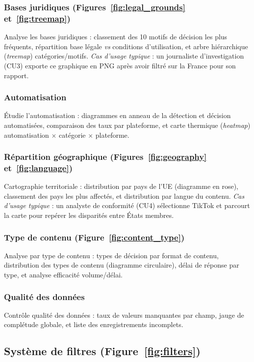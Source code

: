\documentclass[10pt,twocolumn,a4paper]{article}
\begin{document}
\subsubsection{Bases juridiques (Figures~\ref{fig:legal_grounds} et~\ref{fig:treemap})}
Analyse les bases juridiques : classement des 10 motifs de décision les plus fréquents, répartition base légale \textit{vs} conditions d'utilisation, et arbre hiérarchique (\textit{treemap}) catégories/motifs. \textit{Cas d'usage typique} : un journaliste d'investigation (CU3) exporte ce graphique en PNG après avoir filtré sur la France pour son rapport.

\subsubsection{Automatisation}
Étudie l'automatisation : diagrammes en anneau de la détection et décision automatisées, comparaison des taux par plateforme, et carte thermique (\textit{heatmap}) automatisation $\times$ catégorie $\times$ plateforme.

\subsubsection{Répartition géographique (Figures~\ref{fig:geography} et~\ref{fig:language})}
Cartographie territoriale : distribution par pays de l'UE (diagramme en rose), classement des pays les plus affectés, et distribution par langue du contenu. \textit{Cas d'usage typique} : un analyste de conformité (CU4) sélectionne TikTok et parcourt la carte pour repérer les disparités entre États membres.

\subsubsection{Type de contenu (Figure~\ref{fig:content_type})}
Analyse par type de contenu : types de décision par format de contenu, distribution des types de contenu (diagramme circulaire), délai de réponse par type, et analyse efficacité volume/délai.

\subsubsection{Qualité des données}
Contrôle qualité des données : taux de valeurs manquantes par champ, jauge de complétude globale, et liste des enregistrements incomplets.

\subsection{Système de filtres (Figure~\ref{fig:filters})}
\end{document}
